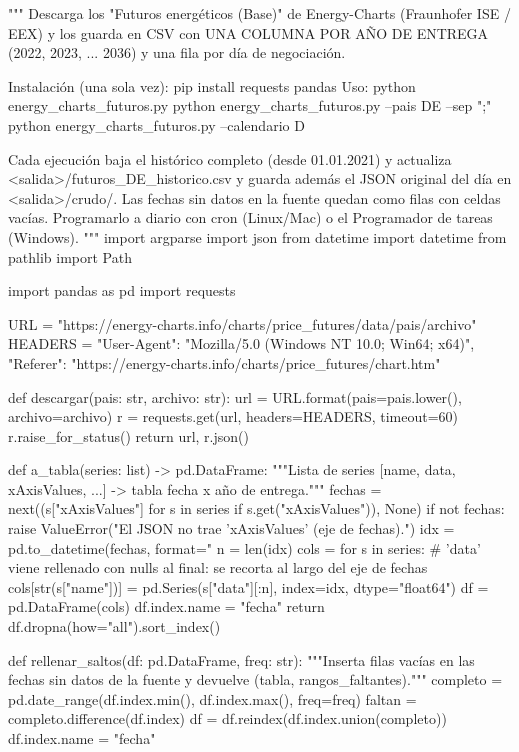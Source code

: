 \documentclass[11pt,letterpaper]{article}
\theoremstyle{plain}
\theoremstyle{definition}
\theoremstyle{remark}
\numberwithin{equation}{section}
\begin{document}
\begin{pythoncode}[
    caption={Código Python para la obtención de precios históricos de futuros},
    label={cod:extraccion_futuros}
]
"""
Descarga los "Futuros energéticos (Base)" de Energy-Charts (Fraunhofer ISE / EEX)
y los guarda en CSV con UNA COLUMNA POR AÑO DE ENTREGA (2022, 2023, ... 2036)
y una fila por día de negociación.

Instalación (una sola vez):   pip install requests pandas
Uso:                          python energy_charts_futuros.py
                              python energy_charts_futuros.py --pais DE --sep ";"
                              python energy_charts_futuros.py --calendario D

Cada ejecución baja el histórico completo (desde 01.01.2021) y actualiza
  <salida>/futuros_DE_historico.csv
y guarda además el JSON original del día en <salida>/crudo/.
Las fechas sin datos en la fuente quedan como filas con celdas vacías.
Programarlo a diario con cron (Linux/Mac) o el Programador de tareas (Windows).
"""
import argparse
import json
from datetime import datetime
from pathlib import Path

import pandas as pd
import requests

URL = "https://energy-charts.info/charts/price_futures/data/{pais}/{archivo}"
HEADERS = {"User-Agent": "Mozilla/5.0 (Windows NT 10.0; Win64; x64)",
           "Referer": "https://energy-charts.info/charts/price_futures/chart.htm"}


def descargar(pais: str, archivo: str):
    url = URL.format(pais=pais.lower(), archivo=archivo)
    r = requests.get(url, headers=HEADERS, timeout=60)
    r.raise_for_status()
    return url, r.json()


def a_tabla(series: list) -> pd.DataFrame:
    """Lista de series [{name, data, xAxisValues}, ...] -> tabla fecha x año de entrega."""
    fechas = next((s["xAxisValues"] for s in series if s.get("xAxisValues")), None)
    if not fechas:
        raise ValueError("El JSON no trae 'xAxisValues' (eje de fechas).")
    idx = pd.to_datetime(fechas, format="%
    n = len(idx)
    cols = {}
    for s in series:
        # 'data' viene rellenado con nulls al final: se recorta al largo del eje de fechas
        cols[str(s["name"])] = pd.Series(s["data"][:n], index=idx, dtype="float64")
    df = pd.DataFrame(cols)
    df.index.name = "fecha"
    return df.dropna(how="all").sort_index()


def rellenar_saltos(df: pd.DataFrame, freq: str):
    """Inserta filas vacías en las fechas sin datos de la fuente y devuelve (tabla, rangos_faltantes)."""
    completo = pd.date_range(df.index.min(), df.index.max(), freq=freq)
    faltan = completo.difference(df.index)
    df = df.reindex(df.index.union(completo))
    df.index.name = "fecha"


\end{pythoncode}
\end{document}
